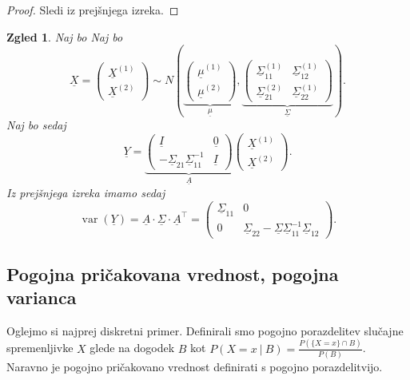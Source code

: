 \documentclass[10pt, a4paper]{article}
\newtheorem{zgled}[izr]{Zgled}
\newenvironment{noticeC}{%
  \tcolorbox[%
  notitle,
  empty,
  enhanced,  %
  breakable,
  coltext=black, 
  fontupper=\rmfamily,
  noparskip,
  sharp corners,
  boxrule=-1pt,  %
  frame hidden,
  left=7pt,  %
  right=7pt,
  top=5pt,
  bottom=5pt,
  before skip=2.5ex plus 2pt,
  after skip=2.5ex plus 2pt,
  overlay unbroken and last={%
  },
  ]}
{\endtcolorbox}
\newenvironment{dokaz}%
  {\begin{noticeC}\begin{proof}}%
  {\end{proof}\end{noticeC}}
\DeclareMathOperator{\vari}{var}
\begin{document}
\begin{dokaz}
  Sledi iz prejšnjega izreka.
\end{dokaz}

\begin{zgled}
  Naj bo Naj bo $$\underline{X} = \begin{pmatrix}
    \underline{X}^{(1)}\\
    \underline{X}^{(2)}
  \end{pmatrix} \sim N\left(\underbrace{\begin{pmatrix}
    \underline{\mu}^{(1)}\\
    \underline{\mu}^{(2)}
  \end{pmatrix}}_{\underline{\mu}}, 
  \underbrace{\begin{pmatrix}
    \underline{\Sigma}_{11}^{(1)} & \underline{\Sigma}_{12}^{(1)}\\
    \underline{\Sigma}_{21}^{(2)} & \underline{\Sigma}_{22}^{(1)}
  \end{pmatrix}}_{\underline{\Sigma}}\right).$$
  Naj bo sedaj $$\underline{Y} = \underbrace{\begin{pmatrix}
    \underline{I} & \underline{0}\\
    - \underline{\Sigma}_{21} \underline{\Sigma}_{11}^{-1} & \underline{I} 
  \end{pmatrix}}_{\underline{A}} \begin{pmatrix}
    \underline{X}^{(1)}\\
    \underline{X}^{(2)}
  \end{pmatrix}.$$
  Iz prejšnjega izreka imamo sedaj 
  $$\vari(\underline{Y}) = \underline{A} \cdot \underline{\Sigma} \cdot \underline{A}^\top = \begin{pmatrix}
    \underline{\Sigma}_{11} & 0\\
    0 & \underline{\Sigma}_{22} - \underline{\Sigma} \underline{\Sigma}_{11} ^{-1} \underline{\Sigma}_{12}
  \end{pmatrix}.$$
\end{zgled}

\subsection{Pogojna pričakovana vrednost, pogojna varianca}

Oglejmo si najprej diskretni primer.
Definirali smo pogojno porazdelitev slučajne spremenljivke $X$ glede na dogodek $B$ 
kot $P(X = x\ |\ B) = \frac{P(\{X = x\} \cap B)}{P(B)}$.
Naravno je pogojno pričakovano vrednost definirati s pogojno porazdelitvijo.
\end{document}

